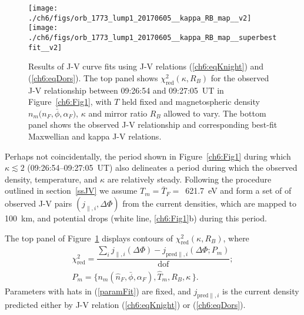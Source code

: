 
  \begin{figure}
    \centering
    \noindent\texttt{[image: ./ch6/figs/orb\_1773\_lump1\_20170605\_\_kappa\_RB\_map\_\_v2]}
    \noindent\texttt{[image: ./ch6/figs/orb\_1773\_lump1\_20170605\_\_kappa\_RB\_map\_\_superbestfit\_\_v2]}
    \caption[Orbit 1773: Reduced chi-squared values for observed J-V curves with
    $T$ held fixed and magnetospheric density $n_m \big ( n_F, \bar{\phi},
    \alpha_F \big )$ $\kappa$ and $R_B$ allowed to vary, and corresponding
    best-fit J-V curves.]{Results of J-V curve fits using J-V relations
      (\ref{ch6:eqKnight}) and (\ref{ch6:eqDors}). The top panel shows
      $\chi^2_{\mathrm{red}} ( \kappa, R_B)$ for the
      observed J-V relationship between 09:26:54 and 09:27:05~UT in
      Figure~\ref{ch6:Fig1}, with $T$ held fixed and magnetospheric density $n_m
      \big ( n_F, \bar{\phi}, \alpha_F \big )$, $\kappa$ and mirror ratio $R_B$
      allowed to vary. The bottom panel shows the observed J-V relationship and
      corresponding best-fit Maxwellian and kappa J-V relations.}
    \label{ch6:Fig3}
  \end{figure}


  Perhaps not coincidentally, the period shown in Figure~\ref{ch6:Fig1} during
  which $\kappa \lesssim 2$ (09:26:54--09:27:05~UT) also delineates a period
  during which the observed density, temperature, and $\kappa$ are relatively
  steady. Following the procedure outlined in section~\ref{ssJV} we assume
  $T_m = \bar{T}_F =$~621.7~eV and form a set of of observed J-V pairs
  $( j_{\parallel,i} , \Delta \Phi )$ from the current densities, which are
  mapped to 100~km, and potential drops (white line, \ref{ch6:Fig1}b) during
  this period.

  The top panel of Figure~\ref{ch6:Fig3} displays contours of
  $\chi^2_{\textrm{red}} ( \kappa, R_B )$, where
  \begin{subequations}
    \begin{align} \chi^2_{\mathrm{red}} = \dfrac{\sum_i j_{\parallel,i} (\Delta \Phi) - j_{\textrm{pred}\parallel,i}(\Delta \Phi; P_m)}{\mathrm{dof}}; \\
      P_m = \Big \{ n_m ( \hat{n}_F, \bar{\phi} , \alpha_F ), \hat{T}_m, R_B,
      \kappa \, \Big \}. \label{paramFit}
    \end{align}
  \end{subequations}
  Parameters with hats in (\ref{paramFit}) are fixed, and
  $j_{\textrm{pred}\parallel,i} $ is the current density predicted either by J-V
  relation (\ref{ch6:eqKnight}) or (\ref{ch6:eqDors}). 

